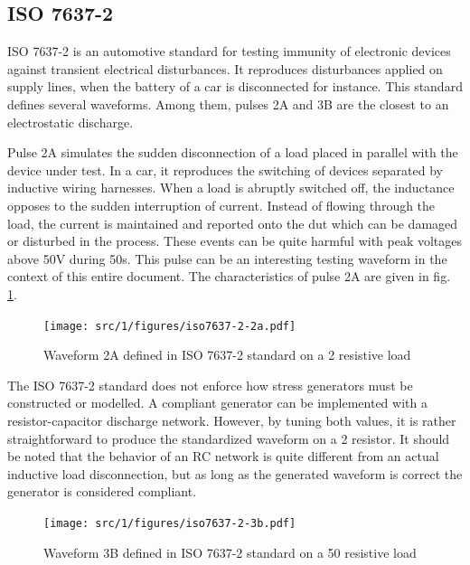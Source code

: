 \subsection{ISO 7637-2}

ISO 7637-2\cite{iso7637-2} is an automotive standard for testing immunity of electronic devices against transient electrical disturbances.
It reproduces disturbances applied on supply lines, when the battery of a car is disconnected for instance.
This standard defines several waveforms.
Among them, pulses 2A and 3B are the closest to an electrostatic discharge.

Pulse 2A simulates the sudden disconnection of a load placed in parallel with the device under test.
In a car, it reproduces the switching of devices separated by inductive wiring harnesses.
When a load is abruptly switched off, the inductance opposes to the sudden interruption of current.
Instead of flowing through the load, the current is maintained and reported onto the \gls{dut} which can be damaged or disturbed in the process.
These events can be quite harmful with peak voltages above 50V during 50\textmu{}s.
This pulse can be an interesting testing waveform in the context of this entire document.
The characteristics of pulse 2A are given in fig. \ref{fig:iso_2a_pulse}.

\begin{figure}[!h]
  \centering
  \texttt{[image: src/1/figures/iso7637-2-2a.pdf]}
  \caption{Waveform 2A defined in ISO 7637-2 standard on a 2\textOmega{} resistive load}
  \label{fig:iso_2a_pulse}
\end{figure}

The ISO 7637-2 standard does not enforce how stress generators must be constructed or modelled.
A compliant generator can be implemented with a resistor-capacitor discharge network.
However, by tuning both values, it is rather straightforward to produce the standardized waveform on a 2\textOmega{} resistor.
It should be noted that the behavior of an RC network is quite different from an actual inductive load disconnection, but as long as the generated waveform is correct the generator is considered compliant.

\begin{figure}[!h]
  \centering
  \texttt{[image: src/1/figures/iso7637-2-3b.pdf]}
  \caption{Waveform 3B defined in ISO 7637-2 standard on a 50\textOmega{} resistive load}
  \label{fig:iso_2b_pulse}
\end{figure}

